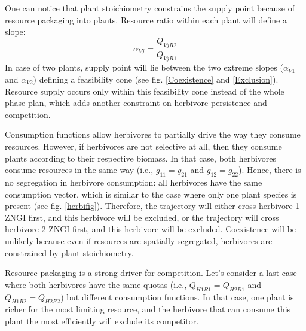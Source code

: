 \documentclass[12pt]{article}
\begin{document}
\par 
One can notice that plant stoichiometry constrains the supply point because of resource packaging into plants. 
Resource ratio within each plant will define a slope:
\begin{equation}
\alpha _{Vj} = \frac{Q_{VjR2}}{Q_{VjR1}}
\end{equation}
In case of two plants, supply point will lie between the two extreme slopes ($\alpha _{V1}$ and $\alpha _{V2}$) defining a feasibility cone (see fig. \ref{Coexistence} and \ref{Exclusion}). Resource supply occurs only within this feasibility cone instead of the whole phase plan, which adds another constraint on herbivore persistence and competition. 
\par
Consumption functions allow herbivores to partially drive the way they consume resources. However, if 
herbivores are not selective at all, then they consume plants according to their respective biomass. In that case, both herbivores consume resources in the same way (i.e., $g_{11}=g_{21}$ and $g_{12}=g_{22}$). Hence, there is no segregation in herbivore consumption: all herbivores have the same consumption vector, which is similar to the case where only one plant species is present (see fig. \ref{herbifig}). Therefore, the trajectory will either cross herbivore 1 ZNGI first, and this herbivore will be excluded, or the trajectory will cross herbivore 2 ZNGI first, and this herbivore will be excluded. %
Coexistence will be unlikely because even if resources are spatially segregated, herbivores are constrained by plant stoichiometry. 
\par
Resource packaging is a strong driver for competition. Let's consider a last case where both herbivores have the same quotas (i.e., $Q_{H1R1}=Q_{H2R1}$ and $Q_{H1R2}=Q_{H2R2}$) but different consumption functions. In that case, one plant is richer for the most limiting resource, and %
the herbivore that can consume this plant the most efficiently will exclude its competitor. %
\par
\end{document}
